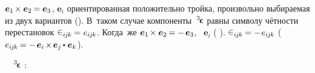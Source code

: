  ${\bm{e}_1 \hspace{-0.2ex} \times \bm{e}_2 \hspace{-0.15ex} = \bm{e}_3}$,
 ${\bm{e}_i}$  ориентированная положительно тройка, произвольно выбираемая из двух вариантов ().
В~таком случае
компоненты~${^3\hspace{-0.25ex}\bm{\epsilon}}\hspace{.05ex}$
равны символу чётности перестановок
${\levicivita_{i\hspace{-0.1ex}j\hspace{-0.1ex}k} \hspace{-0.1ex} = \hspace{.1ex} e_{i\hspace{-0.1ex}j\hspace{-0.1ex}k}}$.
Когда~же ${\bm{e}_1 \hspace{-0.2ex} \times \bm{e}_2 \hspace{-0.15ex} = - \hspace{.25ex} \bm{e}_3}$,  ~${\bm{e}_i}$  ( ).
  ${\levicivita_{i\hspace{-0.1ex}j\hspace{-0.1ex}k} \hspace{-0.1ex} = - \hspace{.2ex} e_{i\hspace{-0.1ex}j\hspace{-0.1ex}k}}$
(~${e_{i\hspace{-0.1ex}j\hspace{-0.1ex}k} \hspace{-0.12ex} = - \hspace{.33ex} \bm{e}_i \hspace{-0.2ex} \times \hspace{-0.2ex} \bm{e}_j \hspace{-0.1ex} \dotp \hspace{.12ex} \bm{e}_k}$).








~~${^3\hspace{-0.25ex}\bm{\epsilon}}\hspace{.05ex}$   :

